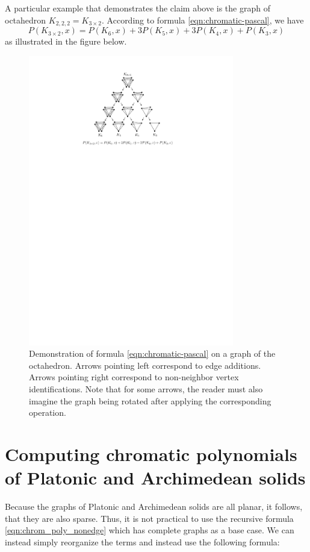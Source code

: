 A particular example that demonstrates the claim above is the graph of octahedron $K_{2,2,2} = K_{3 \times 2}$. According to formula \ref{eqn:chromatic-pascal}, we have \[ P(K_{3 \times 2},x) = P(K_6,x)+3P(K_5,x) + 3P(K_4,x)+P(K_3,x)\] as illustrated in the figure below.

\begin{figure}[H]
    \centering
    \includegraphics[width=0.8\textwidth]{Resources/Figs/octahedral_pascal_demo.pdf}
    \caption{Demonstration of formula \ref{eqn:chromatic-pascal} on a graph of the octahedron. Arrows pointing left correspond to edge additions. Arrows pointing right correspond to non-neighbor vertex identifications. Note that for some arrows, the reader must also imagine the graph being rotated after applying the corresponding operation.}
\end{figure}

\section{Computing chromatic polynomials of Platonic and Archimedean solids}\label{sec:comp-chrompolys}

Because the graphs of Platonic and Archimedean solids are all planar, it follows, that they are also sparse. Thus, it is not practical to use the recursive formula \ref{eqn:chrom_poly_nonedge} which has complete graphs as a base case. We can instead simply reorganize the terms and instead use the following formula:

